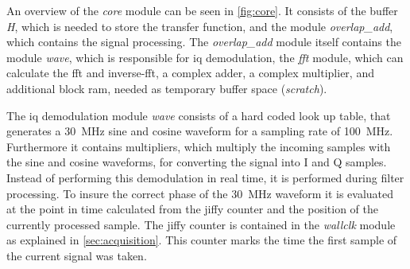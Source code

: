\documentclass[12pt,a4paper,parskip=full,abstract=true,BCOR=12mm,twoside,open=right]{scrreprt}
\def\device#1{\textit{#1}}
\begin{document}
An overview of the \device{core} module can be seen in \cref{fig:core}.
It consists of the buffer \device{H}, which is needed to store the transfer
function, and the module \device{overlap\_add}, which contains the signal
processing. The \device{overlap\_add}
module itself contains the module \device{wave}, which is responsible for \gls{iq}
demodulation, the \device{fft} module, which can calculate the \gls{fft} and
inverse-\gls{fft}, a complex adder, a complex multiplier, and additional block
\gls{ram}, needed as temporary buffer space (\device{scratch}).

The \gls{iq} demodulation module \device{wave} consists of a hard coded look up
table, that generates a \SI{30}{\mega\hertz} sine and cosine waveform for
a sampling rate of \SI{100}{\mega\hertz}. Furthermore it contains multipliers,
which multiply the incoming samples with the sine and cosine waveforms, for
converting the signal into I and Q samples. Instead of performing this demodulation
in real time, it is performed during filter processing. To insure the correct phase
of the \SI{30}{\mega\hertz} waveform it is evaluated at the point in time calculated
from the jiffy counter and the position of the currently processed sample. The jiffy
counter is contained in the \device{wallclk} module as explained in
\cref{sec:acquisition}. This counter marks the time the first sample of the current
signal was taken.
\end{document}
